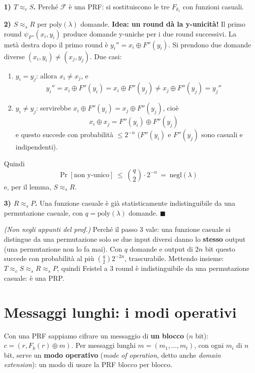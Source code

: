 \textbf{1) \(T \approx_c S\).} Perché \(\mathcal{F}\) è una PRF: si sostituiscono le tre \(F_{k_i}\) con funzioni casuali.

\textbf{2) \(S \approx_s R\)} per \(\text{poly}(\lambda)\) domande. \textbf{Idea: un round dà la y-unicità!} Il primo round \(\psi_{F''}(x_i, y_i)\) produce domande y-uniche per i due round successivi. La metà destra dopo il primo round è \(y_i'' = x_i \oplus F''(y_i)\). Si prendono due domande diverse \((x_i, y_i) \ne (x_j, y_j)\). Due casi:
\begin{enumerate}
  \item[(i)] \(y_i = y_j\): allora \(x_i \ne x_j\), e
  \[
  y_i'' = x_i \oplus F''(y_i) = x_i \oplus F''(y_j) \ne x_j \oplus F''(y_j) = y_j''
  \]
  \item[(ii)] \(y_i \ne y_j\): servirebbe \(x_i \oplus F''(y_i) = x_j \oplus F''(y_j)\), cioè
  \[
  x_i \oplus x_j = F''(y_i) \oplus F''(y_j)
  \]
  e questo succede con probabilità \(\le 2^{-n}\) (\(F''(y_i)\) e \(F''(y_j)\) sono casuali e indipendenti).
\end{enumerate}
Quindi
\[
\Pr[\text{non y-unico}] \ \le\ \binom{q}{2} \cdot 2^{-n} \ =\ \text{negl}(\lambda)
\]
e, per il lemma, \(S \approx_s R\).

\textbf{3) \(R \approx_s P\).} Una funzione casuale è già statisticamente indistinguibile da una permutazione casuale, con \(q = \text{poly}(\lambda)\) domande. \(\blacksquare\)

\begin{nota}
\emph{(Non negli appunti del prof.)} Perché il passo 3 vale: una funzione casuale si distingue da una permutazione solo se due input diversi danno lo \textbf{stesso} output (una permutazione non lo fa mai). Con \(q\) domande e output di \(2n\) bit questo succede con probabilità al più \(\binom{q}{2} 2^{-2n}\), trascurabile. Mettendo insieme: \(T \approx_c S \approx_s R \approx_s P\), quindi Feistel a 3 round è indistinguibile da una permutazione casuale: è una PRP.
\end{nota}

\section{Messaggi lunghi: i modi operativi}

\begin{inbreve}
Con una PRF sappiamo cifrare un messaggio di \textbf{un blocco} (\(n\) bit): \(c = (r, F_k(r) \oplus m)\). Per messaggi lunghi \(m = (m_1, \dots, m_t)\), con ogni \(m_i\) di \(n\) bit, serve un \textbf{modo operativo} (\emph{mode of operation}, detto anche \emph{domain extension}): un modo di usare la PRF blocco per blocco.
\end{inbreve}

